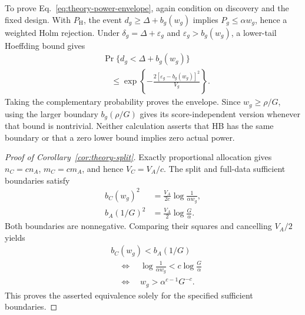 To prove Eq.~\eqref{eq:theory-power-envelope}, again condition on
discovery and the fixed design. With $P_{\mathrm H}$, the event
$d_g\ge\Delta+b_g(w_g)$ implies $P_g\le\alpha w_g$, hence a weighted
Holm rejection. Under $\delta_g=\Delta+\varepsilon_g$ and
$\varepsilon_g>b_g(w_g)$, a lower-tail Hoeffding bound gives
\[
 \begin{aligned}
 &\Pr\{d_g<\Delta+b_g(w_g)\}\\
 &\quad\le\exp\left\{-\frac{2[\varepsilon_g-b_g(w_g)]^2}{V_g}\right\}.
 \end{aligned}
\]
Taking the complementary probability proves the envelope. Since
$w_g\ge\rho/G$, using the larger boundary $b_g(\rho/G)$ gives its
score-independent version whenever that bound is nontrivial. Neither
calculation asserts that HB has the same boundary or that a zero lower
bound implies zero actual power.

\begin{proof}[Proof of Corollary~\ref{cor:theory-split}]
Exactly proportional allocation gives $n_C=cn_A$, $m_C=cm_A$, and hence
$V_C=V_A/c$. The split and full-data sufficient boundaries satisfy
\[
 \begin{aligned}
 b_C(w_g)^2&=\frac{V_A}{2c}\log\frac1{\alpha w_g},\\
 b_A(1/G)^2&=\frac{V_A}{2}\log\frac G\alpha.
 \end{aligned}
\]
Both boundaries are nonnegative. Comparing their squares and cancelling
$V_A/2$ yields
\[
 \begin{aligned}
 &b_C(w_g)<b_A(1/G)\\
 &\quad\Longleftrightarrow\quad
 \log\frac1{\alpha w_g}<c\log\frac G\alpha\\
 &\quad\Longleftrightarrow\quad
 w_g>\alpha^{c-1}G^{-c}.
 \end{aligned}
\]
This proves the asserted equivalence solely for the specified sufficient
boundaries.
\end{proof}

